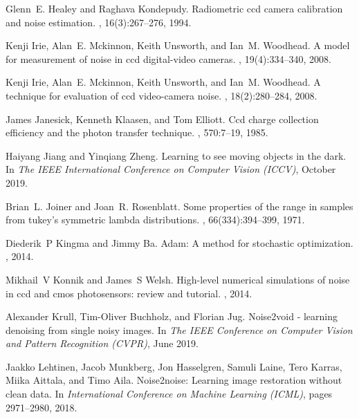 \documentclass[10pt,twocolumn,letterpaper]{article}
\begin{document}
\begin{thebibliography}{10}
Glenn~E. Healey and Raghava Kondepudy.
\newblock Radiometric ccd camera calibration and noise estimation.
,
  16(3):267--276, 1994.

Kenji Irie, Alan~E. Mckinnon, Keith Unsworth, and Ian~M. Woodhead.
\newblock A model for measurement of noise in ccd digital-video cameras.
, 19(4):334--340, 2008.

Kenji Irie, Alan~E. Mckinnon, Keith Unsworth, and Ian~M. Woodhead.
\newblock A technique for evaluation of ccd video-camera noise.
,
  18(2):280--284, 2008.

James Janesick, Kenneth Klaasen, and Tom Elliott.
\newblock Ccd charge collection efficiency and the photon transfer technique.
, 570:7--19, 1985.

Haiyang Jiang and Yinqiang Zheng.
\newblock Learning to see moving objects in the dark.
\newblock In {\em The IEEE International Conference on Computer Vision (ICCV)},
  October 2019.

Brian~L. Joiner and Joan~R. Rosenblatt.
\newblock Some properties of the range in samples from tukey's symmetric lambda
  distributions.
,
  66(334):394--399, 1971.

Diederik~P Kingma and Jimmy Ba.
\newblock Adam: A method for stochastic optimization.
, 2014.

Mikhail~V Konnik and James~S Welsh.
\newblock High-level numerical simulations of noise in ccd and cmos
  photosensors: review and tutorial.
, 2014.

Alexander Krull, Tim-Oliver Buchholz, and Florian Jug.
\newblock Noise2void - learning denoising from single noisy images.
\newblock In {\em The IEEE Conference on Computer Vision and Pattern
  Recognition (CVPR)}, June 2019.

Jaakko Lehtinen, Jacob Munkberg, Jon Hasselgren, Samuli Laine, Tero Karras,
  Miika Aittala, and Timo Aila.
\newblock Noise2noise: Learning image restoration without clean data.
\newblock In {\em International Conference on Machine Learning (ICML)}, pages
  2971--2980, 2018.


\end{thebibliography}
\end{document}
